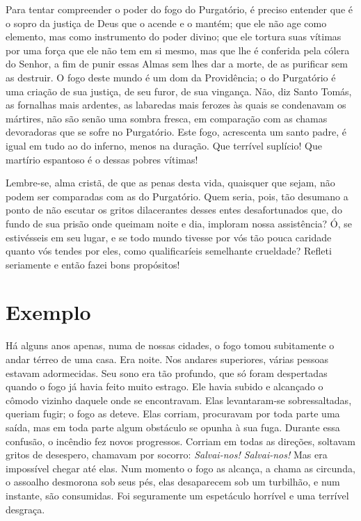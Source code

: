 Para tentar compreender o poder do fogo do Purgatório, é preciso entender que é o sopro da justiça de Deus que o acende e o mantém; que ele não age como elemento, mas como instrumento do poder divino; que ele tortura suas vítimas por uma força que ele não tem em si mesmo, mas que lhe é conferida pela cólera do Senhor, a fim de punir essas Almas sem lhes dar a morte, de as purificar sem as destruir. O fogo deste mundo é um dom da Providência; o do Purgatório é uma criação de sua justiça, de seu furor, de sua vingança. Não, diz Santo Tomás, as fornalhas mais ardentes, as labaredas mais ferozes às quais se condenavam os mártires, não são senão uma sombra fresca, em comparação com as chamas devoradoras que se sofre no Purgatório. Este fogo, acrescenta um santo padre, é igual em tudo ao do inferno, menos na duração. Que terrível suplício! Que martírio espantoso é o dessas pobres vítimas! 

Lembre-se, alma cristã, de que as penas desta vida, quaisquer que sejam, não podem ser comparadas com as do Purgatório. Quem seria, pois, tão desumano a ponto de não escutar os gritos dilacerantes desses entes desafortunados que, do fundo de sua prisão onde queimam noite e dia, imploram nossa assistência? Ó, se estivésseis em seu lugar, e se todo mundo tivesse por vós tão pouca caridade quanto vós tendes por eles, como qualificaríeis semelhante crueldade? Refleti seriamente e então fazei bons propósitos!


\section*{Exemplo}

Há alguns anos apenas, numa de nossas cidades, o fogo tomou subitamente o andar térreo de uma casa. Era noite. Nos andares superiores, várias pessoas estavam adormecidas. Seu sono era tão profundo, que só foram despertadas quando o fogo já havia feito muito estrago. Ele havia subido e alcançado o cômodo vizinho daquele onde se encontravam. Elas levantaram-se sobressaltadas, queriam fugir; o fogo as deteve. Elas corriam, procuravam por toda parte uma saída, mas em toda parte algum obstáculo se opunha à sua fuga. Durante essa confusão, o incêndio fez novos progressos. Corriam em todas as direções, soltavam gritos de desespero, chamavam por socorro: \textit{Salvai-nos! Salvai-nos!} Mas era impossível chegar até elas. Num momento o fogo as alcança, a chama as circunda, o assoalho desmorona sob seus pés, elas desaparecem sob um turbilhão, e num instante, são consumidas. Foi seguramente um espetáculo horrível e uma terrível desgraça. 

